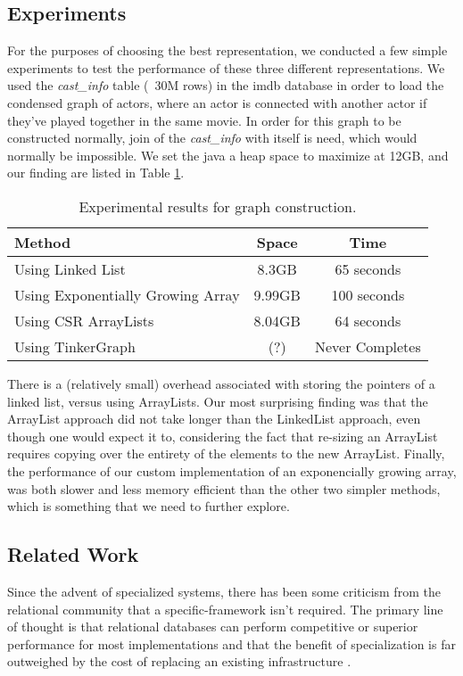 \documentclass[11pt,letterpaper]{article}
\begin{document}
\subsection*{Experiments}
For the purposes of choosing the best representation, we conducted a few simple experiments to test the performance of these three different representations. We used the \textit{cast\_info} table (~30M rows) in the imdb database in order to load the condensed graph of actors, where an actor is connected with another actor if they've played together in the same movie. In order for this graph to be constructed normally, join of the \textit{cast\_info} with itself is need, which would normally be impossible. We set the java a heap space to maximize at 12GB, and our finding are listed in Table \ref{tab:results}.

\begin{table}[h!]
	\centering
	\begin{tabular}{| l | c | c |}
		\hline
		Method & Space & Time \\
		\hline
		Using Linked List & 8.3GB & 65 seconds \\
		Using Exponentially Growing Array & 9.99GB & 100 seconds \\
		Using CSR ArrayLists & 8.04GB & 64 seconds \\
		Using TinkerGraph & (?) & Never Completes \\
		\hline
	\end{tabular}
	\caption{Experimental results for graph construction.}
	\label{tab:results}
\end{table}


There is a (relatively small) overhead  associated with storing the pointers of a linked list, versus using ArrayLists. Our most surprising finding was that the ArrayList approach did not take longer than the LinkedList approach, even though one would expect it to, considering the fact that re-sizing an ArrayList requires copying over the entirety of the elements to the new ArrayList. Finally, the performance of our custom implementation of an exponencially growing array, was both slower and less memory efficient than the other two simpler methods, which is something that we need to further explore.

\subsection*{Related Work}

Since the advent of specialized systems, there has been some criticism from the relational community that a specific-framework isn't required. The primary line of thought is that relational databases can perform competitive or superior performance for most implementations and that the benefit of specialization is far outweighed by the cost of replacing an existing infrastructure \cite{welc_graph_2013}.
\end{document}
